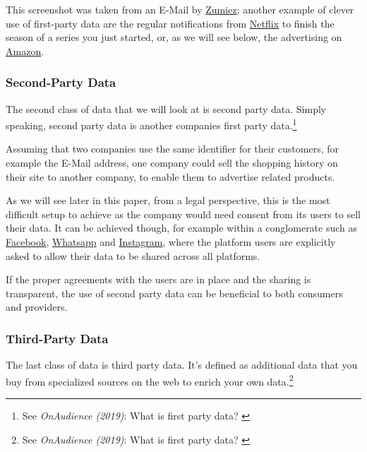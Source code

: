 This screenshot was taken from an E-Mail by \href{https://www.zumiez.com/}{Zumiez}; another example of clever use of first-party data are the regular notifications from \href{https://www.netflix.com/de-en/}{Netflix} to finish the season of a series you just started, or, as we will see below, the advertising on \href{https://smile.amazon.de/}{Amazon}.


\subsubsection{Second-Party Data}

The second class of data that we will look at is second party data. Simply speaking, second party data is another companies first party data.\footnote{See \textit{OnAudience (2019)}: What is first party data? \cite{firstParty}}

Assuming that two companies use the same identifier for their customers, for example the E-Mail address, one company could sell the shopping history on their site to another company, to enable them to advertise related products.

As we will see later in this paper, from a legal perspective, this is the most difficult setup to achieve as the company would need consent from its users to sell their data. It can be achieved though, for example within a conglomerate such as \href{https://www.facebook.com/}{Facebook}, \href{https://www.whatsapp.com/}{Whatsapp} and \href{https://www.instagram.com/}{Instagram}, where the platform users are explicitly asked to allow their data to be shared across all platforms.

If the proper agreements with the users are in place and the sharing is transparent, the use of second party data can be beneficial to both consumers and providers.

\subsubsection{Third-Party Data}

The last class of data is third party data. It's defined as additional data that you buy from specialized sources on the web to enrich your own data.\footnote{See \textit{OnAudience (2019)}: What is first party data? \cite{firstParty}}

